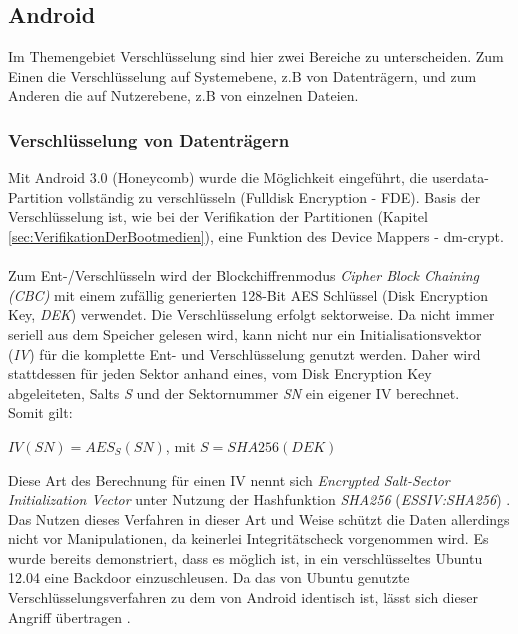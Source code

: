 \subsection{Android}
	Im Themengebiet Verschlüsselung sind hier zwei Bereiche zu unterscheiden. Zum Einen die Verschlüsselung auf Systemebene, z.B von Datenträgern, und zum Anderen die auf Nutzerebene, z.B von einzelnen Dateien.

	\subsubsection{Verschlüsselung von Datenträgern}\label{sec:encrypt-volume}
	Mit Android 3.0 (Honeycomb) wurde die Möglichkeit eingeführt, die userdata-Partition vollständig zu verschlüsseln (Fulldisk Encryption - FDE). Basis der Verschlüsselung ist, wie bei der Verifikation der Partitionen (Kapitel \ref{sec:VerifikationDerBootmedien}), eine Funktion des Device Mappers - dm-crypt.\\\\
	Zum Ent-/Verschlüsseln wird der Blockchiffrenmodus \textit{Cipher Block Chaining (CBC)} mit einem zufällig generierten 128-Bit AES Schlüssel (Disk Encryption Key, \textit{DEK}) verwendet. Die Verschlüsselung erfolgt sektorweise. Da nicht immer seriell aus dem Speicher gelesen wird, kann nicht nur ein Initialisationsvektor (\textit{IV}) für die komplette Ent- und Verschlüsselung genutzt werden. Daher wird stattdessen für jeden Sektor anhand eines, vom Disk Encryption Key abgeleiteten, Salts \textit{S} und der Sektornummer \textit{SN} ein eigener IV berechnet.\\
	Somit gilt:
\begin{center}
	\begin{math}
	IV(SN) = AES_{S}(SN)\end{math}, mit \begin{math}S = SHA256(DEK)
	\end{math}
\end{center}
	Diese Art des Berechnung für einen IV nennt sich \textit{Encrypted Salt-Sector Initialization Vector} unter Nutzung der Hashfunktion \textit{SHA256} (\textit{ESSIV:SHA256}) \cite[S. 259]{Elenkov2014}. Das Nutzen dieses Verfahren in dieser Art und Weise schützt die Daten allerdings nicht vor Manipulationen, da keinerlei Integritätscheck vorgenommen wird. Es wurde bereits demonstriert, dass es möglich ist, in ein verschlüsseltes Ubuntu 12.04 eine Backdoor einzuschleusen. Da das von Ubuntu genutzte Verschlüsselungsverfahren zu dem von Android identisch ist, lässt sich dieser Angriff übertragen \cite{Jakob}.\\\\
